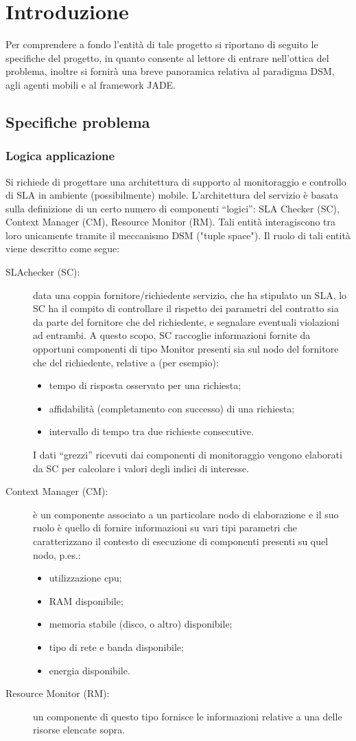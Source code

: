 \chapter{Introduzione}\label{cap:introduzione}
Per comprendere a fondo l'entità di tale progetto si riportano di seguito le specifiche del progetto, in quanto consente al lettore di entrare nell'ottica del problema, inoltre si fornirà una breve panoramica relativa al paradigma DSM, agli agenti mobili\cite{slide} e al framework JADE.
\section{Specifiche problema}
\subsection{Logica applicazione}
Si richiede di progettare una architettura di supporto al monitoraggio e controllo di SLA in ambiente (possibilmente) mobile. L’architettura del servizio è basata sulla definizione di un certo numero di componenti “logici”: SLA Checker (SC), Context Manager (CM), Resource Monitor (RM). Tali entità interagiscono tra loro unicamente tramite il meccanismo DSM ("tuple space"). Il ruolo di tali entità viene descritto come segue:
\begin{description}
\item[SLAchecker (SC):] data una coppia fornitore/richiedente servizio, che ha stipulato un SLA, lo SC ha il compito di controllare il rispetto dei parametri del contratto sia da parte del fornitore che del richiedente, e segnalare eventuali violazioni ad entrambi. A questo scopo, SC raccoglie informazioni fornite da opportuni componenti di tipo Monitor presenti sia sul nodo del fornitore che del richiedente, relative a (per esempio):
\begin{itemize}
\item tempo di risposta osservato per una richiesta;
\item affidabilità (completamento con successo) di una richiesta;
\item intervallo di tempo tra due richieste consecutive.
\end{itemize}
I dati “grezzi” ricevuti dai componenti di monitoraggio vengono elaborati da SC per calcolare i valori degli indici di interesse.
\item[Context Manager (CM):] è un componente associato a un particolare nodo di elaborazione e il suo ruolo è quello di fornire informazioni su vari tipi parametri che caratterizzano il contesto di esecuzione di componenti presenti su quel nodo, p.es.:
\begin{itemize}
\item utilizzazione cpu;
\item RAM disponibile;
\item memoria stabile (disco, o altro) disponibile;
\item tipo di rete e banda disponibile;
\item energia disponibile.
\end{itemize}
\item[Resource Monitor (RM):] un componente di questo tipo fornisce le informazioni relative a una delle risorse elencate sopra.
\end{description}
